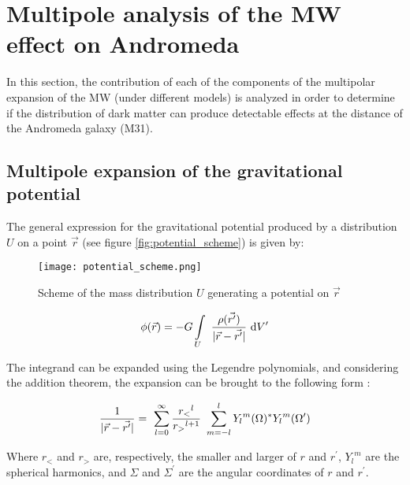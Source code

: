 
\chapter{Multipole analysis of the MW effect on Andromeda}

In this section, the contribution of each of the components of the multipolar expansion of the MW (under different models) is analyzed in order to determine if the distribution of dark matter can produce detectable effects at the distance of the Andromeda galaxy (M31).


\section{Multipole expansion of the gravitational potential}

The general expression for the gravitational potential produced by a distribution $U$ on a point $\vec{r}$ (see figure \ref{fig:potential_scheme}) is given by:

\begin{figure}
    \label{fig:potential_scheme}
    \centering
    \texttt{[image: potential\_scheme.png]}
    \caption{Scheme of the mass distribution $U$ generating a potential on $\vec{r}$}
    \label{fig:my_label}
\end{figure}

\begin{equation}\label{eq:pot_def}
    \phi (\vec{r}) = -G\int\displaylimits_U \
    \frac{\rho(\vec{r^\prime})}{|\vec{r}-\vec{r^\prime}|} \ 
    \mathrm{d}V^\prime
\end{equation}

The integrand can be expanded using the Legendre polynomials, and considering the addition theorem, the expansion can be brought to the following form \cite{arfken_ed7_chap16}:

\begin{equation*}
    \frac{1}{|\vec{r}-\vec{r^\prime}|} = \ 
    \sum\displaylimits_{l=0}^{\infty} \frac{{r_<}^l}{{r_>}^{l+1}} \ 
    \sum\displaylimits_{m=-l}^{l} {Y_l}^m(\Omega)^*{Y_l}^m(\Omega^\prime)
\end{equation*}

Where $r_<$ and $r_>$ are, respectively, the smaller and larger of $r$ and $r^\prime$, ${Y_l}^m$ are the spherical harmonics, and $\Sigma$ and $\Sigma^\prime$ are the angular coordinates of $r$ and $r^\prime$.

